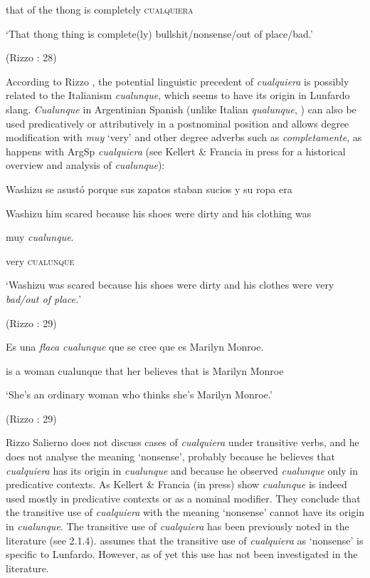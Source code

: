     that  of  the  thong  is  completely  \textsc{cualquiera}

    ‘That thong thing is complete(ly) bullshit/nonsense/out of place/bad.’

    (Rizzo \citealt{Salierno2013}: 28)

According to Rizzo \citet{Salierno2013}, the potential linguistic precedent of \textit{cualquiera} is possibly related to the Italianism \textit{cualunque}, which seems to have its origin in Lunfardo slang. \textit{Cualunque} in Argentinian Spanish (unlike Italian \textit{qualunque}, \citealt{Author2021}) can also be used predicatively or attributively in a postnominal position and allows degree modification with \textit{muy} ‘very’ and other degree adverbs such as \textit{completamente}, as happens with ArgSp \textit{cualquiera} (see Kellert \& Francia in press for a historical overview and analysis of \textit{cualunque}):

    Washizu  se  asustó  porque  sus  zapatos  staban  sucios  y  su  ropa  era

    Washizu  him  scared  because  his  shoes  were  dirty  and  his  clothing  was

    muy  \textit{cualunque}.

    very  \textsc{cualunque}

    ‘Washizu was scared because his shoes were dirty and his clothes were very \textit{bad/out of place.}’

    (Rizzo \citealt{Salierno2013}: 29)

    Es  una  \textit{flaca}  \textit{cualunque}  que  se  cree  que  es  Marilyn  Monroe.

    is  a  woman  cualunque  that  her  believes  that  is  Marilyn  Monroe

    ‘She’s an ordinary woman who thinks she’s Marilyn Monroe.’

    (Rizzo \citealt{Salierno2013}: 29)

Rizzo Salierno does not discuss cases of \textit{cualquiera} under transitive verbs, and he does not analyse the meaning ‘nonsense’, probably because he believes that \textit{cualquiera} has its origin in \textit{cualunque} and because he observed \textit{cualunque} only in predicative contexts. As Kellert \& Francia (in press) show \textit{cualunque} is indeed used mostly in predicative contexts or as a nominal modifier. They conclude that the transitive use of \textit{cualquiera} with the meaning ‘nonsense’ cannot have its origin in \textit{cualunque}. The transitive use of \textit{cualquiera} has been previously noted in the literature (see 2.1.4). \citet{Conde2011} assumes that the transitive use of \textit{cualquiera} as ‘nonsense’ is specific to Lunfardo. However, as of yet this use has not been investigated in the literature.

